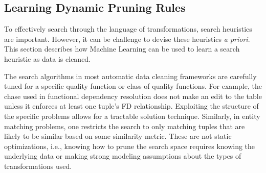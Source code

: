 
% 
% 







\subsection{Learning Dynamic Pruning Rules}\label{s:dynlearn}
To effectively search through the language of transformations, search heuristics are important.
However, it can be challenge to devise these heuristics \emph{a priori}.
This section describes how Machine Learning can be used to learn a search heuristic as data is cleaned.

The search algorithms in  most automatic data cleaning frameworks are carefully tuned for a specific quality function or class of quality functions. For example, the chase used in functional dependency resolution does not make an edit to the table unless it enforces at least one tuple's FD relationship. Exploiting the structure of the specific problems allows for a tractable solution technique. Similarly, in entity matching problems, one restricts the search to only matching tuples that are likely to be similar based on some similarity metric.
These are not static optimizations, i.e., knowing how to prune the search space requires knowing the underlying data or making strong modeling assumptions about the types of transformations used.

